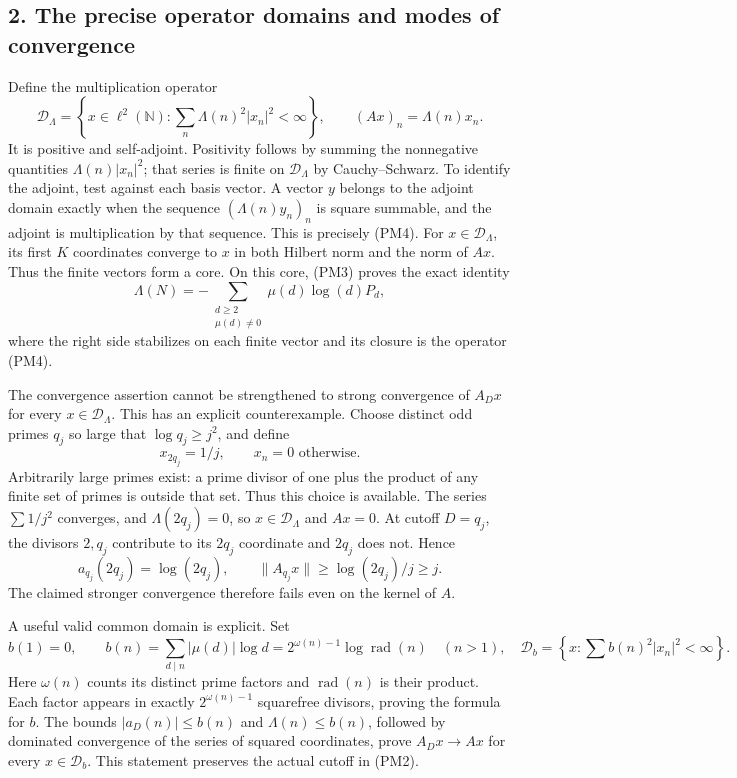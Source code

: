 \documentclass[
  10pt,
  a4paper,
]{article}
\begin{document}
\subsection{2. The precise operator domains and modes of
convergence}\label{the-precise-operator-domains-and-modes-of-convergence}

Define the multiplication operator \[
\mathcal D_\Lambda=\left\{x\in\ell^2(\mathbb N):
\sum_n\Lambda(n)^2|x_n|^2<\infty\right\},\qquad
(Ax)_n=\Lambda(n)x_n.
\tag{PM4}
\] It is positive and self-adjoint. Positivity follows by summing the
nonnegative quantities \(\Lambda(n)|x_n|^2\); that series is finite on
\(\mathcal D_\Lambda\) by Cauchy--Schwarz. To identify the adjoint, test
against each basis vector. A vector \(y\) belongs to the adjoint domain
exactly when the sequence \((\Lambda(n)y_n)_n\) is square summable, and
the adjoint is multiplication by that sequence. This is precisely (PM4).
For \(x\in\mathcal D_\Lambda\), its first \(K\) coordinates converge to
\(x\) in both Hilbert norm and the norm of \(Ax\). Thus the finite
vectors form a core. On this core, (PM3) proves the exact identity \[
\boxed{\Lambda(N)=-\sum_{\substack{d\ge2\\\mu(d)\ne0}}
\mu(d)\log(d)P_d,}
\tag{PM5}
\] where the right side stabilizes on each finite vector and its closure
is the operator (PM4).

The convergence assertion cannot be strengthened to strong convergence
of \(A_Dx\) for every \(x\in\mathcal D_\Lambda\). This has an explicit
counterexample. Choose distinct odd primes \(q_j\) so large that
\(\log q_j\ge j^2\), and define \[
x_{2q_j}=1/j,\qquad x_n=0\text{ otherwise}.
\tag{PM6}
\] Arbitrarily large primes exist: a prime divisor of one plus the
product of any finite set of primes is outside that set. Thus this
choice is available. The series \(\sum1/j^2\) converges, and
\(\Lambda(2q_j)=0\), so \(x\in\mathcal D_\Lambda\) and \(Ax=0\). At
cutoff \(D=q_j\), the divisors \(2,q_j\) contribute to its \(2q_j\)
coordinate and \(2q_j\) does not. Hence \[
a_{q_j}(2q_j)=\log(2q_j),\qquad
\|A_{q_j}x\|\ge\log(2q_j)/j\ge j.
\tag{PM7}
\] The claimed stronger convergence therefore fails even on the kernel
of \(A\).

A useful valid common domain is explicit. Set \[
b(1)=0,\qquad
b(n)=\sum_{d\mid n}|\mu(d)|\log d
=2^{\omega(n)-1}\log\operatorname{rad}(n)\quad(n>1),
\quad
\mathcal D_b=\left\{x:\sum b(n)^2|x_n|^2<\infty\right\}.
\tag{PM8}
\] Here \(\omega(n)\) counts its distinct prime factors and
\(\operatorname{rad}(n)\) is their product. Each factor appears in
exactly \(2^{\omega(n)-1}\) squarefree divisors, proving the formula for
\(b\). The bounds \(|a_D(n)|\le b(n)\) and \(\Lambda(n)\le b(n)\),
followed by dominated convergence of the series of squared coordinates,
prove \(A_Dx\to Ax\) for every \(x\in\mathcal D_b\). This statement
preserves the actual cutoff in (PM2).
\end{document}
